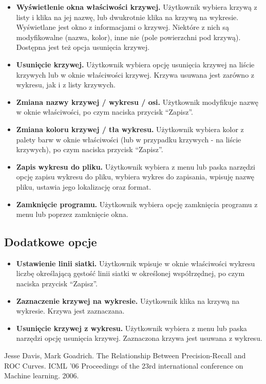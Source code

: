 \documentclass[12pt,a4paper,titlepage]{article}
\begin{document}
\begin{itemize}
\item \textbf{Wyświetlenie okna właściwości krzywej.} Użytkownik wybiera krzywą z listy i klika na jej nazwę, lub dwukrotnie klika na krzywą na wykresie. Wyświetlane jest okno z informacjami o krzywej. Niektóre z nich są modyfikowalne (nazwa, kolor), inne nie (pole powierzchni pod krzywą). Dostępna jest też opcja usunięcia krzywej.
\item \textbf{Usunięcie krzywej.} Użytkownik wybiera opcję usunięcia krzywej na liście krzywych lub w oknie właściwości krzywej. Krzywa usuwana jest zarówno z wykresu, jak i z listy krzywych.
\item \textbf{Zmiana nazwy krzywej / wykresu / osi.} Użytkownik modyfikuje nazwę w oknie właściwości, po czym naciska przycisk “Zapisz”.
\item \textbf{Zmiana koloru krzywej / tła wykresu.} Użytkownik wybiera kolor z palety barw w oknie właściwości (lub w przypadku krzywych - na liście krzywych), po czym naciska przycisk “Zapisz”.
\item \textbf{Zapis wykresu do pliku.} Użytkownik wybiera z menu lub paska narzędzi opcję zapisu wykresu do pliku, wybiera wykres do zapisania, wpisuję nazwę pliku, ustawia jego lokalizację oraz format.
\item \textbf{Zamknięcie programu.} Użytkownik wybiera opcję zamknięcia programu z menu lub poprzez zamknięcie okna.
\end{itemize}
\subsection{Dodatkowe opcje}
\begin{itemize}
\item \textbf{Ustawienie linii siatki.} Użytkownik wpisuje w oknie właściwości wykresu liczbę określającą gęstość linii siatki w określonej współrzędnej, po czym naciska przycisk “Zapisz”.
\item \textbf{Zaznaczenie krzywej na wykresie.} Użytkownik klika na krzywą na wykresie. Krzywa jest zaznaczana.
\item \textbf{Usunięcie krzywej z wykresu.} Użytkownik wybiera z menu lub paska narzędzi opcję usunięcia krzywej. Zaznaczona krzywa jest usuwana z wykresu.
\end{itemize}
\begin{thebibliography}{1}
Jesse Davis, Mark Goadrich. The Relationship Between Precision-Recall and ROC Curves. ICML '06 Proceedings of the 23rd international conference on Machine learning. 2006.
\end{thebibliography}
\end{document}
